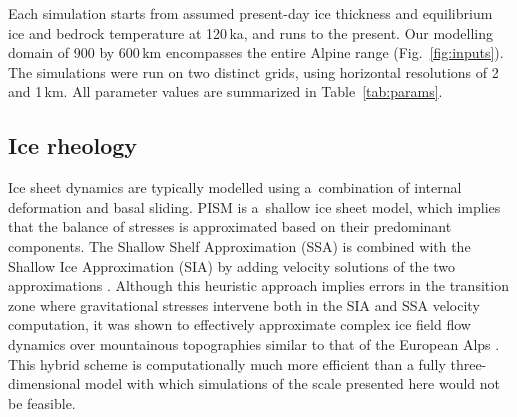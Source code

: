 \documentclass[tc, manuscript]{copernicus}
\begin{document}
    Each simulation starts from assumed present-day ice thickness and
    equilibrium ice and bedrock temperature at 120\,\unit{ka}, and runs to the
    present. Our modelling domain of 900 by 600\,\unit{km} encompasses the
    entire Alpine range (Fig.~\ref{fig:inputs}). The simulations were run on
    two distinct grids, using horizontal resolutions of 2 and 1\,\unit{km}.
    All parameter values are summarized in Table~\ref{tab:params}.


\subsection{Ice rheology}
\label{sec:icedyn}

    Ice sheet dynamics are typically modelled using a~combination of internal
    deformation and basal sliding. PISM is a~shallow ice sheet model, which
    implies that the balance of stresses is approximated based on their
    predominant components. The Shallow Shelf Approximation (SSA) is combined
    with the Shallow Ice Approximation (SIA) by adding velocity solutions of
    the two approximations \citep[Eqs.~7--9 and 15]{Winkelmann.etal.2011}.
    Although this heuristic approach implies errors in the transition zone
    where gravitational stresses intervene both in the SIA and SSA velocity
    computation, it was shown to effectively approximate complex ice field flow
    dynamics over mountainous topographies similar to that of the European Alps
    \citep{Golledge.etal.2012, Ziemen.etal.2016}. This hybrid scheme is
    computationally much more efficient than a fully three-dimensional model
    with which simulations of the scale presented here would not be feasible.
\end{document}
